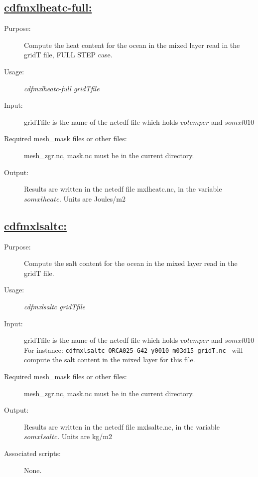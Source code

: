 \documentclass[a4paper,11pt]{article}
\begin{document}
\newpage
\subsection*{\underline{cdfmxlheatc-full:}}
\begin{description}
\item[Purpose:] Compute the heat content for the ocean in the mixed layer read in the gridT file, FULL STEP case.
\item[Usage:] {\em cdfmxlheatc-full gridTfile }
\item[Input:] gridTfile is the name of the netcdf file which holds $votemper$ and $somxl010$  \\
\item[Required mesh\_mask files or other files:]    mesh\_zgr.nc, mask.nc must be in the current directory.
\item[Output:] Results are written in the netcdf file mxlheatc.nc, in the variable $somxlheatc$. Units are Joules/m2
\end{description}

\subsection*{\underline{cdfmxlsaltc:}}
\begin{description}
\item[Purpose:] Compute the salt content for the ocean in the mixed layer read in the gridT file.
\item[Usage:] {\em cdfmxlsaltc gridTfile }
\item[Input:] gridTfile is the name of the netcdf file which holds $votemper$ and $somxl010$  \\

For instance: {\tt cdfmxlsaltc  ORCA025-G42\_y0010\_m03d15\_gridT.nc  } will compute the salt content in the mixed layer for this file.

\item[Required mesh\_mask files or other files:]    mesh\_zgr.nc, mask.nc must be in the current directory.
\item[Output:] Results are written in the netcdf file mxlsaltc.nc, in the variable $somxlsaltc$. Units are kg/m2
\item[Associated scripts:] {None.}
\end{description}
\end{document}

